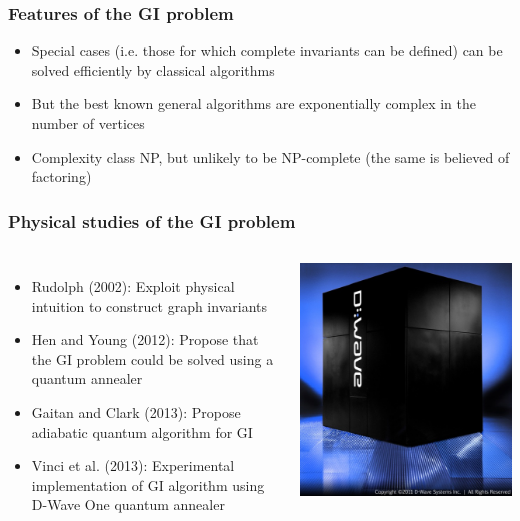 \documentclass[handout]{beamer}
\begin{document}
\begin{frame}
  \frametitle{Features of the GI problem}
  \begin{itemize}
    \item Special cases (i.e. those for which complete invariants can be
      defined) can be solved efficiently by classical algorithms
    \item But the best known general algorithms are exponentially complex in
      the number of vertices
    \item Complexity class \alert{NP}, but unlikely to be NP-complete (the same
      is believed of factoring)
  \end{itemize}
\end{frame}
\begin{frame}
  \frametitle{Physical studies of the GI problem}
    \begin{columns}
      \begin{itemize}
        \item Rudolph (2002):
          Exploit physical intuition to construct graph invariants
        \item Hen and Young (2012):
          Propose that the GI problem could be solved using a
          quantum annealer
        \item Gaitan and Clark (2013):
          Propose adiabatic quantum algorithm for GI
        \item Vinci et al. (2013):
          Experimental implementation of GI algorithm using D-Wave One quantum
          annealer
      \end{itemize}
      \includegraphics[width=\textwidth]{d_wave_one_system}
    \end{columns}
\end{frame}
\end{document}
